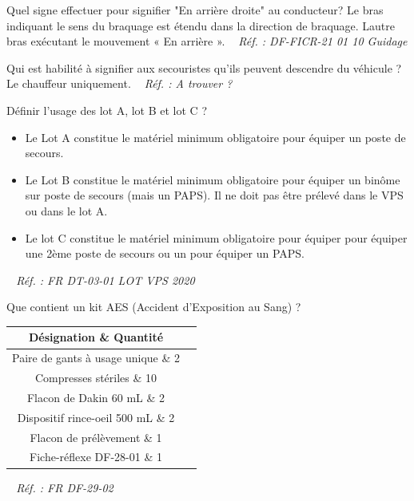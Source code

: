 \documentclass[grid,avery5371,landscape]{flashcards}
\makeatletter
\newcounter{nocarte}
\newcommand{\categ}[1]{%
  \def\@categ{#1}%
  \setcounter{nocarte}{0}%
}
\newcommand{\source}[1]{%
  \medskip
  \itshape%
   ~ \hfill Réf. : #1}
\makeatother
\begin{document}
\color[HTML]{01DFA5}
\categ{TECH}
\begin{flashcard}[véhicule]{
 Quel signe effectuer pour signifier "En arrière droite" au conducteur?   }
  Le bras indiquant le sens du braquage est étendu dans la direction de braquage. Lautre bras exécutant le mouvement « En arrière ».
  \source{DF-FICR-21 01 10 Guidage}
\end{flashcard}


\color[HTML]{01DFA5}
\categ{TECH}
\begin{flashcard}[véhicule]{
 Qui est habilité à signifier aux secouristes qu'ils peuvent descendre du véhicule ?   }
  Le chauffeur uniquement.
  \source{A trouver ?}
\end{flashcard}


\color[HTML]{01DFA5}
\categ{TECH}
\begin{flashcard}[matériel]{
 Définir l'usage des lot A, lot B et lot C ?   }
  \begin{itemize}
        \item Le Lot A constitue le matériel minimum obligatoire pour équiper un poste de secours.
        \item Le Lot B constitue le matériel minimum obligatoire pour équiper un binôme sur poste de secours (mais un PAPS). Il ne doit pas être prélevé dans le VPS ou dans le lot A.
        \item Le lot C constitue le matériel minimum obligatoire pour équiper pour équiper une 2ème poste de secours ou un pour équiper un PAPS.
    \end{itemize}
  \source{FR DT-03-01 LOT VPS 2020}
\end{flashcard}


\color[HTML]{01DFA5}
\categ{TECH}
\begin{flashcard}[matériel]{
 Que contient un kit AES (Accident d'Exposition au Sang) ?   }
  \begin{tabular}{c|c}
        Désignation \& Quantité \\ \hline
        Paire de gants à usage unique \& 2 \\
        Compresses stériles \& 10 \\
        Flacon de Dakin 60 mL \& 2 \\
        Dispositif rince-oeil 500 mL \& 2 \\
        Flacon de prélèvement \& 1 \\
        Fiche-réflexe DF-28-01 \& 1
\end{tabular}
  \source{FR DF-29-02}
\end{flashcard}
\end{document}
